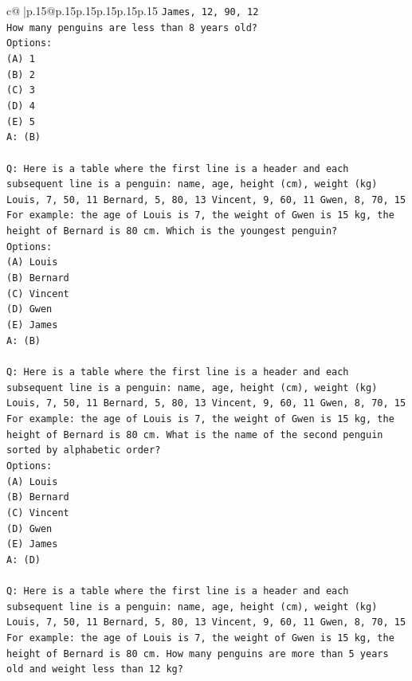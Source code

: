 \documentclass{article}
\begin{document}
{\begin{supertabular}{c@{$\;$}|p{.15\linewidth}@{}p{.15\linewidth}p{.15\linewidth}p{.15\linewidth}p{.15\linewidth}p{.15\linewidth}}
{{{\texttt{James, 12, 90, 12} \\
\texttt{How many penguins are less than 8 years old?} \\
\texttt{Options:} \\
\texttt{(A) 1} \\
\texttt{(B) 2} \\
\texttt{(C) 3} \\
\texttt{(D) 4} \\
\texttt{(E) 5} \\
\texttt{A: (B)} \\
\\ 
\texttt{Q: Here is a table where the first line is a header and each subsequent line is a penguin:  name, age, height (cm), weight (kg) Louis, 7, 50, 11 Bernard, 5, 80, 13 Vincent, 9, 60, 11 Gwen, 8, 70, 15  For example: the age of Louis is 7, the weight of Gwen is 15 kg, the height of Bernard is 80 cm.  Which is the youngest penguin?} \\
\texttt{Options:} \\
\texttt{(A) Louis} \\
\texttt{(B) Bernard} \\
\texttt{(C) Vincent} \\
\texttt{(D) Gwen} \\
\texttt{(E) James} \\
\texttt{A: (B)} \\
\\ 
\texttt{Q: Here is a table where the first line is a header and each subsequent line is a penguin:  name, age, height (cm), weight (kg) Louis, 7, 50, 11 Bernard, 5, 80, 13 Vincent, 9, 60, 11 Gwen, 8, 70, 15  For example: the age of Louis is 7, the weight of Gwen is 15 kg, the height of Bernard is 80 cm.  What is the name of the second penguin sorted by alphabetic order?} \\
\texttt{Options:} \\
\texttt{(A) Louis} \\
\texttt{(B) Bernard} \\
\texttt{(C) Vincent} \\
\texttt{(D) Gwen} \\
\texttt{(E) James} \\
\texttt{A: (D)} \\
\\ 
\texttt{Q: Here is a table where the first line is a header and each subsequent line is a penguin:  name, age, height (cm), weight (kg) Louis, 7, 50, 11 Bernard, 5, 80, 13 Vincent, 9, 60, 11 Gwen, 8, 70, 15  For example: the age of Louis is 7, the weight of Gwen is 15 kg, the height of Bernard is 80 cm.  How many penguins are more than 5 years old and weight less than 12 kg?} \\
}}}
\end{supertabular}}
\end{document}
